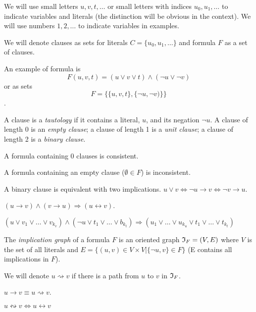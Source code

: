 We will use small letters $u, v, t, \ldots$ or small letters
with indices $u_0, u_1, \ldots$ to indicate variables and literals
(the distinction will be obvious in the context). We will use numbers
$1, 2, \ldots$ to indicate variables in examples.

We will denote clauses as sets for literals $C = \{ u_0, u_1, \ldots \}$
and formula $F$ as a set of clauses.

An example of formula is
\[
F(u, v, t) = (u \lor v \lor t) \land (\neg u \lor \neg v)
\]
or as sets
\[
F = \{ \{u, v, t\}, \{\neg u, \neg v)\}\}
\]
.

\begin{mydef}
  A clause is a \emph{tautology} if it contains a literal, $u$, and its negation
  $\neg u$. A clause of length 0 is an \emph{empty clause}; a clause of length 1
  is a \emph{unit clause}; a clause of length 2 is a \emph{binary clause}. 
\end{mydef}

\begin{myprop}
  A formula containing 0 clauses is consistent.
\end{myprop}

\begin{myprop}
  A formula containing an empty clause ($\emptyset \in F$) is inconsistent.
\end{myprop}

\begin{myprop}
  A binary clause is equivalent with two implications.
  $u \lor v \iff \neg u \rightarrow v \iff \neg v \rightarrow u$.
\end{myprop}

\begin{myprop}
  \label{myprop:equivalent-literals}
  $(u \rightarrow v) \land (v \rightarrow u) \Rightarrow (u \leftrightarrow v)$.
\end{myprop}

\begin{myprop}[Resolution]
  $(u \lor v_1 \lor \ldots \lor v_{k_v})
  \land (\neg u \lor t_1 \lor \ldots \lor b_{k_t})
  \Rightarrow (u_1 \lor \ldots \lor u_{k_u} \lor t_1 \lor \ldots \lor t_{k_t})$
\end{myprop}

\begin{mydef}
  The \emph{implication graph} of a formula $F$ is an oriented graph
  $\mathfrak{I}_F = (V, E)$ where $V$ is the set of all literals and $E = \{(u,
  v) \in V \times V | \{\neg u, v\} \in F\}$ (E contains all implications in $F$).
\end{mydef}

We will denote $u \rightsquigarrow v$ if there is a path from $u$ to $v$ in $\mathfrak{I}_F$.

\begin{myprop}
  $u \rightarrow v \equiv u \rightsquigarrow v$.
\end{myprop}

\begin{myprop}
  \label{myprop:equivalent-literals-in-if}
  $u \leftrightsquigarrow v \iff u \leftrightarrow v$
\end{myprop}
